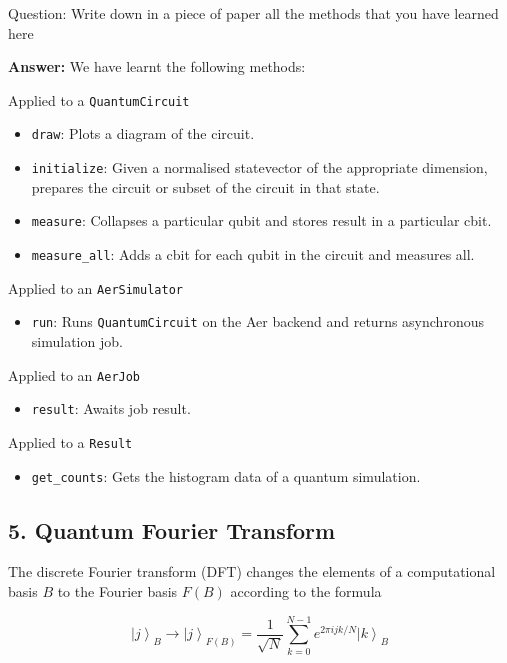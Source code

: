 \documentclass[11pt]{article}
\begin{document}
    Question: Write down in a piece of paper all the methods that you have
learned here

    \textbf{Answer:} We have learnt the following methods:

Applied to a \texttt{QuantumCircuit} 

\begin{itemize}
    \item \texttt{draw}: Plots a diagram of
    the circuit. 
    \item \texttt{initialize}: Given a normalised statevector of
    the appropriate dimension, prepares the circuit or subset of the circuit
    in that state. 
    \item \texttt{measure}: Collapses a particular qubit and
    stores result in a particular cbit. 
    \item \texttt{measure\_all}: Adds a cbit
    for each qubit in the circuit and measures all.
\end{itemize}

Applied to an \texttt{AerSimulator} 

\begin{itemize}
    \item  \texttt{run}: Runs \texttt{QuantumCircuit} on the Aer backend and returns 
    asynchronous simulation job.
\end{itemize}

Applied to an \texttt{AerJob} 

\begin{itemize}
    \item \texttt{result}: Awaits job result.
\end{itemize}

Applied to a \texttt{Result} 

\begin{itemize}
    \item \texttt{get\_counts}: Gets the histogram
    data of a quantum simulation.
\end{itemize}

    \subsection*{5. Quantum Fourier Transform}\label{quantum-fourier-transform}

    The discrete Fourier transform (DFT) changes the elements of a
computational basis \(B\) to the Fourier basis \(F(B)\) according to the
formula

\[
\left|j\right\rangle_{B}\rightarrow \left|j\right\rangle_{F(B)} =  \frac{1}{\sqrt{N}}\sum^{N-1}_{k=0} e^{2\pi i j k /N}\left|k\right\rangle_{B}
\]
\end{document}
